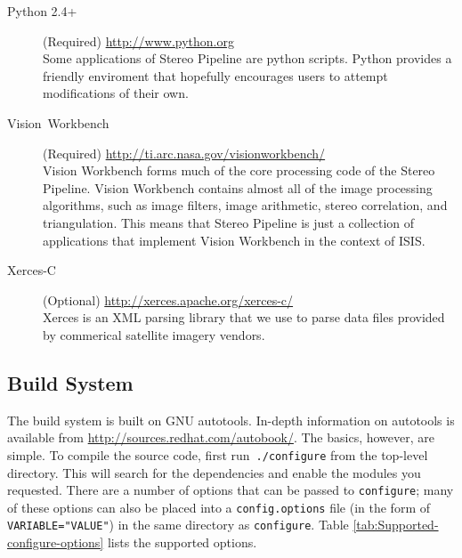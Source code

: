 \begin{description}
\item [{Python 2.4+}] (Required) \url{http://www.python.org}\\
Some applications of Stereo Pipeline are python scripts. Python
provides a friendly enviroment that hopefully encourages users to
attempt modifications of their own.

\item [{Vision~Workbench}] (Required) \url{http://ti.arc.nasa.gov/visionworkbench/}\\
Vision Workbench forms much of the core processing code of the Stereo
Pipeline. Vision Workbench contains almost all of the image processing
algorithms, such as image filters, image arithmetic, stereo
correlation, and triangulation. This means that Stereo Pipeline is
just a collection of applications that implement Vision Workbench in
the context of ISIS.

\item [{Xerces-C}] (Optional) \url{http://xerces.apache.org/xerces-c/}\\
Xerces is an XML parsing library that we use to parse data files provided
by commerical satellite imagery vendors.

\end{description}

\subsection{Build System}

The build system is built on GNU autotools. In-depth information on
autotools is available from \url{http://sources.redhat.com/autobook/}.
The basics, however, are simple. To compile the source code, first
run~\verb#./configure# from the top-level directory. This will search
for the dependencies and enable the modules you requested. There are
a number of options that can be passed to \verb#configure#; many
of these options can also be placed into a \verb#config.options#
file (in the form of \verb#VARIABLE="VALUE"#) in the same directory
as \verb#configure#. Table \ref{tab:Supported-configure-options}
lists the supported options.

